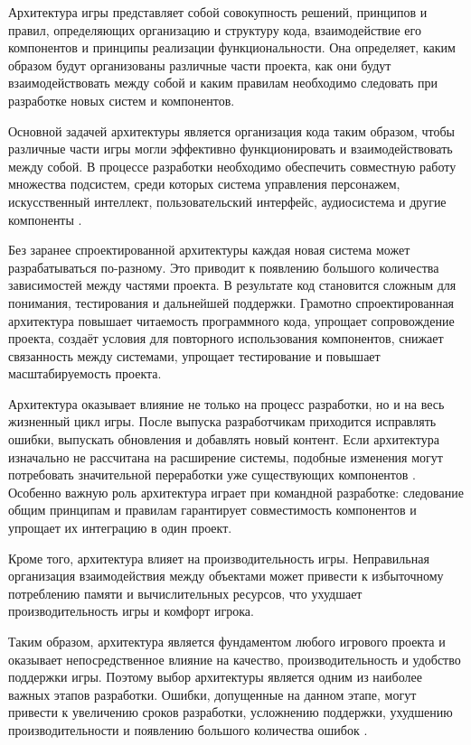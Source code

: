 \documentclass[a4paper,12pt]{report}
\begin{document}
Архитектура игры представляет собой совокупность решений, принципов и правил, определяющих организацию и структуру кода, взаимодействие его компонентов и принципы реализации функциональности. Она определяет, каким образом будут организованы различные части проекта, как они будут взаимодействовать между собой и каким правилам необходимо следовать при разработке новых систем и компонентов.

Основной задачей архитектуры является организация кода таким образом, чтобы различные части игры могли эффективно функционировать и взаимодействовать между собой. В процессе разработки необходимо обеспечить совместную работу множества подсистем, среди которых система управления персонажем, искусственный интеллект, пользовательский интерфейс, аудиосистема и другие компоненты \cite{vishwakarma2025}.

Без заранее спроектированной архитектуры каждая новая система может разрабатываться по-разному. Это приводит к появлению большого количества зависимостей между частями проекта. В результате код становится сложным для понимания, тестирования и дальнейшей поддержки. Грамотно спроектированная архитектура повышает читаемость программного кода, упрощает сопровождение проекта, создаёт условия для повторного использования компонентов, снижает связанность между системами, упрощает тестирование и повышает масштабируемость проекта.

Архитектура оказывает влияние не только на процесс разработки, но и на весь жизненный цикл игры. После выпуска разработчикам приходится исправлять ошибки, выпускать обновления и добавлять новый контент. Если архитектура изначально не рассчитана на расширение системы, подобные изменения могут потребовать значительной переработки уже существующих компонентов \cite{martin2017}. Особенно важную роль архитектура играет при командной разработке: следование общим принципам и правилам гарантирует совместимость компонентов и упрощает их интеграцию в один проект.

Кроме того, архитектура влияет на производительность игры. Неправильная организация взаимодействия между объектами может привести к избыточному потреблению памяти и вычислительных ресурсов, что ухудшает производительность игры и комфорт игрока.

Таким образом, архитектура является фундаментом любого игрового проекта и оказывает непосредственное влияние на качество, производительность и удобство поддержки игры. Поэтому выбор архитектуры является одним из наиболее важных этапов разработки. Ошибки, допущенные на данном этапе, могут привести к увеличению сроков разработки, усложнению поддержки, ухудшению производительности и появлению большого количества ошибок \cite{martin2017}.
\end{document}
